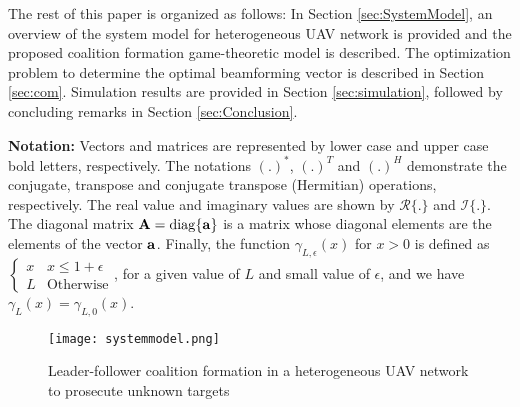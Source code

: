 \documentclass[conference]{IEEEtran}
\theoremstyle{remark}
\theoremstyle{lemma}
\def\bA{{\bf A}}
\def\ba{{\bf a}}
\def\diag{{\rm diag}}
\begin{document}
The rest of this paper is organized as follows: In Section \ref{sec:SystemModel}, an overview of the system model for heterogeneous UAV network is provided and the proposed coalition formation game-theoretic model is described. The optimization problem to determine the optimal beamforming vector is described in Section \ref{sec:com}. Simulation results are provided in Section \ref{sec:simulation}, followed by concluding remarks in Section \ref{sec:Conclusion}.

\textbf{Notation:} Vectors and matrices are represented by lower case and upper case bold letters, respectively. The notations $(.)^*$, $(.)^T$ and $(.)^H$ demonstrate the conjugate, transpose and conjugate transpose (Hermitian) operations, respectively. The real value and imaginary values are shown by $\mathcal{R}\{.\}$ and $\mathcal{I}\{.\}$. The diagonal matrix $\bA = \diag\{\ba\}$ is a matrix whose diagonal elements are the elements of the vector $\ba$. Finally, the function $\gamma_{L,\epsilon}(x)$ for $x>0$ is defined as
$\left\{\begin{array}{cc}
         x & x \leq 1 + \epsilon\\
         L & \mbox{Otherwise}
       \end{array}\right.$, for a given value of $L$ and small value of $\epsilon$, and we have $\gamma_{L}(x)=\gamma_{L,0}(x)$.

\begin{figure}[t]
  \centering
  \centerline{\texttt{[image: systemmodel.png]}}
 \vspace{-5 pt}
\caption{Leader-follower coalition formation in a heterogeneous UAV network to prosecute unknown targets}
\label{fig:systemmodel}
 \vspace{-15 pt}
\end{figure}
\end{document}
